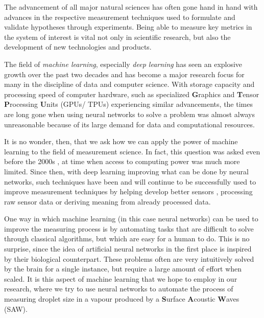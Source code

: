 The advancement of all major natural sciences has often gone hand in hand with advances in the respective measurement techniques used to formulate and validate hypotheses through experiments. 
Being able to measure key metrics in the system of interest is vital not only in scientific research, but also the development of new technologies and products. 

The field of \emph{machine learning}, especially \emph{deep learning} has seen an explosive growth over the past two decades and has become a major research focus for many in the discipline of data and computer science. 
With storage capacity and processing speed of computer hardware, such as specialized \textbf{G}raphics and \textbf{T}ensor \textbf{P}rocessing \textbf{U}nits (GPUs/ TPUs) experiencing similar advancements, the times are long gone when using neural networks to solve a problem was almost always unreasonable because of its large demand for data and computational resources. 

It is no wonder, then, that we ask how we can apply the power of machine learning to the field of measurement science. In fact, this question was asked even before the 2000s \cite{alippiArtificialIntelligenceInstruments1998}, at time when access to computing power was much more limited. Since then, with deep learning improving what can be done by neural networks, such techniques have been and will continue to be successfully used to improve measurement techniques by helping develop better sensors \cite{ballardMachineLearningComputationenabled2021}, processing raw sensor data or deriving meaning from already processed data. 

One way in which machine learning (in this case neural networks) can be used to improve the measuring process is by automating tasks that are difficult to solve through classical algorithms, but which are easy for a human to do. This is no surprise, since the idea of artificial neural networks in the first place is inspired by their biological counterpart. These problems often are very intuitively solved by the brain for a single instance, but require a large amount of effort when scaled. 
It is this aspect of machine learning that we hope to employ in our research, where we try to use neural networks to automate the process of measuring droplet size in a vapour produced by a \textbf{S}urface \textbf{A}coustic \textbf{W}aves (SAW). 

